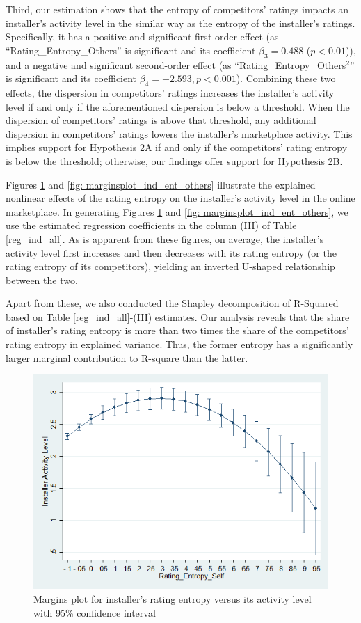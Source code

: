 \documentclass[mnsc,blindrev]{informs3}
\begin{document}
	Third,  our estimation shows that the entropy of competitors' ratings impacts an installer's activity level in the similar way as the entropy of the installer's ratings. Specifically, it has a positive and significant first-order effect (as ``Rating\_Entropy\_Others'' is significant and its coefficient $\beta_{3} =  0.488$ ($p<0.01$)), and a negative and significant second-order effect (as ``Rating\_Entropy\_Others$^{2}$'' is significant and its coefficient $\beta_{4} = -2.593, p<0.001$). Combining these two effects,
	the dispersion in competitors' ratings increases the installer's activity level if and only if the aforementioned dispersion is below a threshold. When the dispersion of competitors' ratings is above that threshold, any additional dispersion in competitors' ratings lowers the installer's marketplace activity. This implies support for Hypothesis 2A if and only if the competitors' rating entropy is below the threshold; otherwise, our findings offer support for Hypothesis 2B.
	
	
	Figures \ref{fig: marginsplot_ind_ent_self} and  \ref{fig: marginsplot_ind_ent_others} illustrate the explained nonlinear effects of the rating entropy on the installer's activity level in the online marketplace. In generating Figures \ref{fig: marginsplot_ind_ent_self} and  \ref{fig: marginsplot_ind_ent_others}, we use the estimated regression coefficients in the column (III) of Table \ref{reg_ind_all}. As is apparent from these figures, on average, the installer's activity level first increases and then decreases with its rating entropy (or the rating entropy of its competitors), yielding an inverted U-shaped relationship between the two.

{\color{blue} Apart from these, we also conducted the Shapley decomposition of R-Squared based on Table \ref{reg_ind_all}-(III) estimates. Our analysis reveals that the share of installer's rating entropy is more than two times the share of the competitors' rating entropy in explained variance. Thus, the former entropy has a significantly larger marginal contribution to R-square than the latter.}
	
	\begin{figure}
		\centering
		\includegraphics[width=0.7\linewidth]{marginsplot_entself.png}
		\caption{Margins plot for installer's rating entropy versus its activity level with 95\% confidence interval}
		\label{fig: marginsplot_ind_ent_self}
	\end{figure}
	
\end{document}
